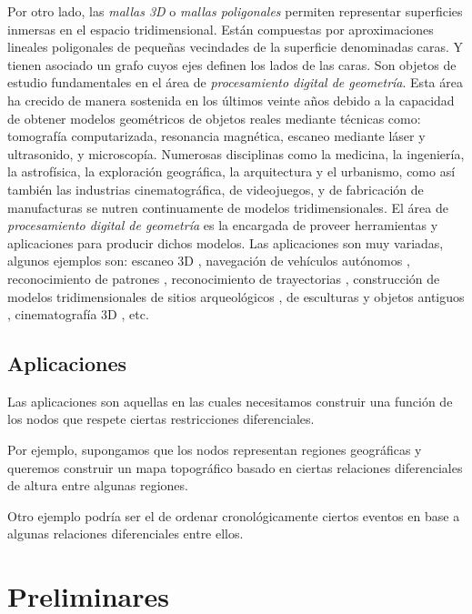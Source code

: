 \documentclass[conference,compsoc,a4paper]{IEEEtran}
\begin{document}
\bigskip

Por otro lado, las \textit{mallas 3D} o \textit{mallas poligonales} 
\cite{BKPAL:2010} permiten representar superficies inmersas en el 
espacio tridimensional. Están compuestas por aproximaciones lineales 
poligonales de pequeñas vecindades de la superficie denominadas caras. 
Y tienen asociado un grafo cuyos ejes definen los lados de las caras. 
Son objetos de estudio fundamentales en el área de 
\textit{procesamiento digital de geometría}. Esta área ha crecido de 
manera sostenida en los últimos veinte años debido a la capacidad de 
obtener modelos geométricos de objetos reales mediante técnicas como: 
tomografía computarizada, resonancia magnética, escaneo mediante láser y 
ultrasonido, y microscopía. Numerosas disciplinas como la medicina, la 
ingeniería, la astrofísica, la exploración geográfica, la arquitectura 
y el urbanismo, como así también las industrias cinematográfica, de 
videojuegos, y de fabricación de manufacturas se nutren continuamente 
de modelos tridimensionales. El área de \textit{procesamiento digital 
de geometría} es la encargada de proveer herramientas y aplicaciones 
para producir dichos modelos. Las aplicaciones son muy variadas, 
algunos ejemplos son: escaneo 3D 
\cite{LRAT:2008}, navegación de vehículos autónomos \cite{CMT:2008}, 
reconocimiento de patrones \cite{TC:1992}, 
reconocimiento de trayectorias \cite{ZT:2009}, construcción de modelos 
tridimensionales de sitios arqueológicos \cite{REVEAL}, de esculturas 
y objetos antiguos \cite{BMMRT:2002}, cinematografía 3D 
\cite{RT:2007}, etc.

\subsection{Aplicaciones}

Las aplicaciones son aquellas en las cuales necesitamos construir una 
función de los nodos que respete ciertas restricciones diferenciales.

Por ejemplo, supongamos que los nodos representan regiones geográficas 
y queremos construir un mapa topográfico basado en ciertas relaciones 
diferenciales de altura entre algunas regiones.

Otro ejemplo podría ser el de ordenar cronológicamente ciertos eventos 
en base a algunas relaciones diferenciales entre ellos.

\section{Preliminares}
\end{document}
